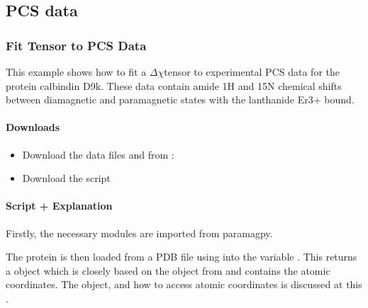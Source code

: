 \documentclass[a4paper,10pt,english,openany,oneside]{sphinxmanual}
\begin{document}
\subsection{PCS data}
\label{\detokenize{examples/index:pcs-data}}

\subsubsection{Fit Tensor to PCS Data}
\label{\detokenize{examples/pcs_fit:fit-tensor-to-pcs-data}}\label{\detokenize{examples/pcs_fit:pcs-fit}}\label{\detokenize{examples/pcs_fit::doc}}
\sphinxAtStartPar
This example shows how to fit a \({\Delta\chi}\)\sphinxhyphen{}tensor to experimental PCS data for the protein calbindin D9k. These data contain amide 1H and 15N chemical shifts between diamagnetic and paramagnetic states with the lanthanide Er3+ bound.


\paragraph{Downloads}
\label{\detokenize{examples/pcs_fit:downloads}}\begin{itemize}
\item {} 
\sphinxAtStartPar
Download the data files  and  from :

\item {} 
\sphinxAtStartPar
Download the script 

\end{itemize}


\paragraph{Script + Explanation}
\label{\detokenize{examples/pcs_fit:script-explanation}}
\sphinxAtStartPar
Firstly, the necessary modules are imported from paramagpy.

\begin{sphinxVerbatim}[commandchars=\\\{\}]
      
\end{sphinxVerbatim}

\sphinxAtStartPar
The protein is then loaded from a PDB file using {\hyperref[\detokenize{reference/generated/paramagpy.protein.load_pdb:paramagpy.protein.load_pdb}]{}} into the variable . This returns a  object which is closely based on the  object from  and contains the atomic coordinates. The object, and how to access atomic coordinates is discussed at this .
\end{document}
